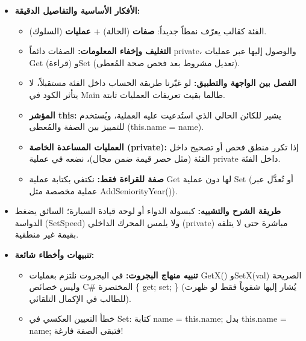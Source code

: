 \documentclass[14pt]{extarticle}
\begin{document}
\begin{itemize}[itemsep=0.3em]
    \item \textbf{الأفكار الأساسية والتفاصيل الدقيقة:}
    \begin{itemize}
        \item الفئة كقالب يعرّف نمطاً جديداً: \textbf{صفات} (الحالة) + \textbf{عمليات} (السلوك).
        \item \textbf{التغليف وإخفاء المعلومات:} الصفات دائماً \textenglish{private}، والوصول إليها عبر عمليات \textenglish{Get} (قراءة) و\textenglish{Set} (تعديل مشروط بعد فحص صحة المُعطى).
        \item \textbf{الفصل بين الواجهة والتطبيق:} لو غيّرنا طريقة الحساب داخل الفئة مستقبلاً، لا يتأثر الكود في \textenglish{Main} طالما بقيت تعريفات العمليات ثابتة.
        \item \textbf{المؤشر \textenglish{this}:} يشير للكائن الحالي الذي استُدعيت عليه العملية، ويُستخدم للتمييز بين الصفة والمُعطى (\textenglish{this.name = name}).
        \item \textbf{العمليات المساعدة الخاصة (\textenglish{private}):} إذا تكرر منطق فحص أو تصحيح داخل الفئة (مثل حصر قيمة ضمن مجال)، نضعه في عملية \textenglish{private} داخل الفئة.
        \item \textbf{صفة للقراءة فقط:} نكتفي بكتابة عملية \textenglish{Get} لها دون عملية \textenglish{Set} (أو تُعدَّل عبر عملية مخصصة مثل \textenglish{AddSeniorityYear()}).
    \end{itemize}
    \item \textbf{طريقة الشرح والتشبيه:} كبسولة الدواء أو لوحة قيادة السيارة؛ السائق يضغط الدواسة (\textenglish{SetSpeed}) ولا يلمس المحرك الداخلي (\textenglish{private}) مباشرة حتى لا يتلفه بقيمة غير منطقية.
    \item \textbf{تنبيهات وأخطاء شائعة:}
    \begin{itemize}
        \item \textbf{تنبيه منهاج البجروت:} في البجروت نلتزم بعمليات \textenglish{GetX()} و\textenglish{SetX(val)} الصريحة وليس خصائص \textenglish{C\#} المختصرة \textenglish{\{ get; set; \}} (يُشار إليها شفوياً فقط لو ظهرت للطالب في الإكمال التلقائي).
        \item خطأ التعيين العكسي في \textenglish{Set}: كتابة \textenglish{name = this.name;} بدل \textenglish{this.name = name;} فتبقى الصفة فارغة!
    \end{itemize}
\end{itemize}

\filbreak
\end{document}
